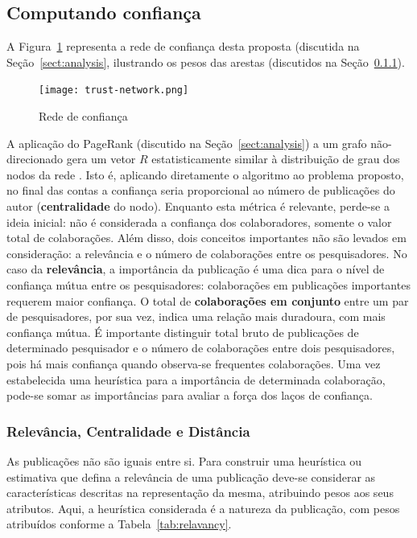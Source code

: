 \documentclass[12pt]{article}
\begin{document}
\subsection{Computando confiança} \label{sect:computing-trust}

A Figura~\ref{fig:network} representa a rede de confiança desta proposta (discutida na Seção~\ref{sect:analysis}, ilustrando os pesos das arestas (discutidos na Seção~\ref{sect:relevancy}).

  \begin{figure}[ht]
    \centering
    \texttt{[image: trust-network.png]}
    \caption{Rede de confiança}
    \label{fig:network}
  \end{figure}

A aplicação do PageRank (discutido na Seção~\ref{sect:analysis}) a um grafo não-direcionado gera um vetor $R$ estatisticamente similar à distribuição de grau dos nodos da rede \cite{perra2008spectral}. Isto é, aplicando diretamente o algoritmo ao problema proposto, no final das contas a confiança seria proporcional ao número de publicações do autor (\textbf{centralidade} do nodo). Enquanto esta métrica é relevante, perde-se a ideia inicial: não é considerada a confiança dos colaboradores, somente o valor total de colaborações. Além disso, dois conceitos importantes não são levados em consideração: a relevância e o número de colaborações entre os pesquisadores. No caso da \textbf{relevância}, a importância da publicação é uma dica para o nível de confiança mútua entre os pesquisadores: colaborações em publicações importantes requerem maior confiança. O total de \textbf{colaborações em conjunto} entre um par de pesquisadores, por sua vez, indica uma relação mais duradoura, com mais confiança mútua. É importante distinguir total bruto de publicações de determinado pesquisador e o número de colaborações entre dois pesquisadores, pois há mais confiança 
quando observa-se frequentes colaborações.  Uma vez estabelecida uma heurística para a importância de determinada colaboração, pode-se somar as importâncias para avaliar a força dos laços de confiança.

\subsubsection{Relevância, Centralidade e Distância} \label{sect:relevancy}

As publicações não são iguais entre si. Para construir uma heurística ou estimativa que defina a relevância de uma publicação deve-se considerar as características descritas na representação da mesma, atribuindo pesos aos seus atributos. Aqui, a heurística considerada é a natureza da publicação, com pesos atribuídos conforme a Tabela~\ref{tab:relavancy}.
\end{document}
